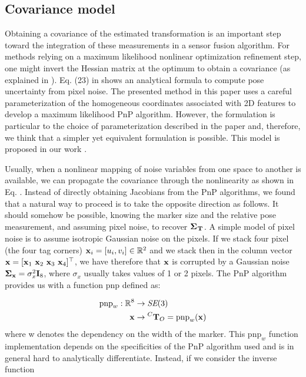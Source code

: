 \subsection{Covariance model}
Obtaining a covariance of the estimated transformation is an important step toward the integration of these measurements in a sensor fusion algorithm.
For methods relying on a maximum likelihood nonlinear optimization refinement step, one might invert the Hessian matrix at the optimum to obtain a covariance 
(as explained in ).
Eq. (23) in \cite{urban2016mlpnp} shows an analytical formula to compute pose uncertainty from pixel noise.
The presented method in this paper uses a careful parameterization of the homogeneous coordinates associated with 2D features to develop
a maximum likelihood PnP algorithm.  However, the formulation is particular to the choice of parameterization described in the paper and, 
therefore, we think that a simpler yet equivalent formulation is possible. This model is proposed in our work \cite{fourmy2019absolute}. 

Usually, when a nonlinear mapping of noise variables from one space to another is available, we can propagate the covariance through the nonlinearity
as shown in Eq. .  
Instead of directly obtaining Jacobians from the PnP algorithms, we found that a natural way to proceed is to take the opposite 
direction as follows. It should somehow be possible, knowing the marker size and the relative pose measurement, and assuming pixel noise, to
recover ${\bm \Sigma}_{\prescript{}{}{{\bf T}}_{}}$. A simple model of pixel noise is to assume isotropic Gaussian noise on the pixels. If we stack four pixel (the four tag corners) 
${\bf x}_i = [u_i, v_i] \in \mathbb{R}^2$ and we stack then in the column vector ${\bf x} = [{\bf x}_1~{\bf x}_2~{\bf x}_3~{\bf x}_4]^{\top}$, we have therefore that
${\bf x}$ is corrupted by a Gaussian noise ${\bm \Sigma}_{{\bf x}} = \sigma_{x}^2 {\bf I}_8$, where $\sigma_{x}$ usually takes values of 1 or 2 pixels.
The PnP algorithm provides us with a function $\text{pnp}$ defined as:

\begin{equation}
    \begin{split}
        \text{pnp}_w: \mathbb{R}^8 &\rightarrow \textit{SE}(3) \\
                           {\bf x} &\rightarrow \prescript{C}{}{{\bf T}}_{O} = \text{pnp}_w({\bf x})
    \end{split}
\end{equation}
%
where w denotes the dependency on the width of the marker. This $\text{pnp}_w$ function implementation depends on the specificities of the PnP algorithm used and  
is in general hard to analytically differentiate. Instead, if we consider the inverse function

